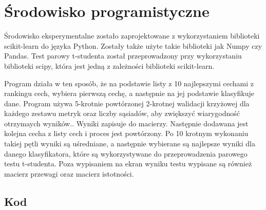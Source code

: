 \documentclass[runningheads]{llncs}
\begin{document}
\section{Środowisko programistyczne}
Środowisko eksperymentalne zostało zaprojektowane z wykorzystaniem biblioteki scikit-learn \cite{scikit-learn} do języka Python\cite{py3.8}. Zostały także użyte takie biblioteki jak Numpy\cite{harris2020array} czy Pandas\cite{reback2020pandas}. Test parowy t-studenta został przeprowadzony przy wykorzystaniu biblioteki scipy\cite{2020SciPy-NMeth}, która jest jedną z zależności biblioteki scikit-learn. 

Program działa w ten sposób, że na podstawie listy z 10 najlepszymi cechami z rankingu cech, wybiera pierwszą cechę, a następnie na jej podstawie klasyfikuje dane. Program używa 5-krotnie powtórzonej 2-krotnej walidacji krzyżowej\cite{k-fold} dla każdego zestawu metryk oraz liczby sąsiadów, aby zwiększyć wiarygodność otrzymaych wyników.. Wyniki zapisuje do macierzy. Następnie dodawana jest kolejna cecha z listy cech i proces jest powtórzony. Po 10 krotnym wykonaniu takiej pętli wyniki są uśredniane, a następnie wybierane są najlepsze wyniki dla danego klasyfikatora, które są wykorzystywane do przeprowadzenia parowego testu t-studenta. Poza wypisaniem na ekran wyniku testu wypisane są również macierz przewagi oraz macierz istotności.
\subsection{Kod}
\end{document}
